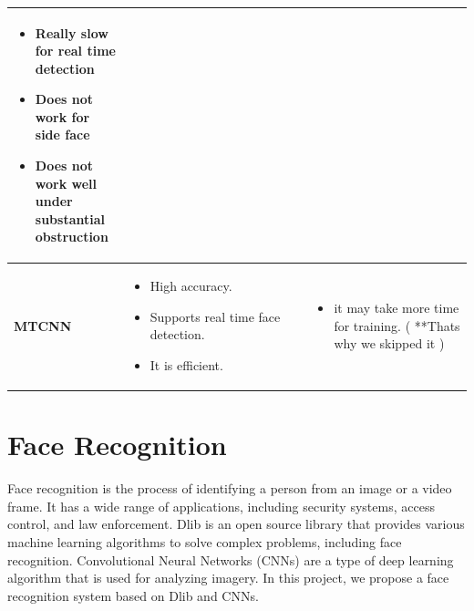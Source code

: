 \begin{table}[h]
\begin{tabular}{|p{0.25\linewidth}|p{0.4\linewidth}|p{0.4\linewidth}|}
\begin{itemize}
    \item Really slow for
    real time
    detection
    \item Does not work for
    side face
    \item  Does not work
    well under
    substantial
    obstruction
    \end{itemize} \\
    \hline
    \textbf{MTCNN} & 
    \begin{itemize}
    \item High accuracy.
    \item Supports real time face
    detection.
    \item It is efficient.
    \end{itemize}
    &
    \begin{itemize}
    \item it may take more
    time for training. ( **Thats why we skipped it )
    \end{itemize} \\
    \hline
    \end{tabular}
    \label{tab:itemX}
    \end{table}

\clearpage
\section{Face Recognition}
Face recognition is the process of identifying a person from an image or a video frame. It has a wide range of applications, including security systems, access control, and law enforcement. Dlib is an open source library that provides various machine learning algorithms to solve complex problems, including face recognition. Convolutional Neural Networks (CNNs) are a type of deep learning algorithm that is used for analyzing imagery. In this project, we propose a face recognition system based on Dlib and CNNs.


